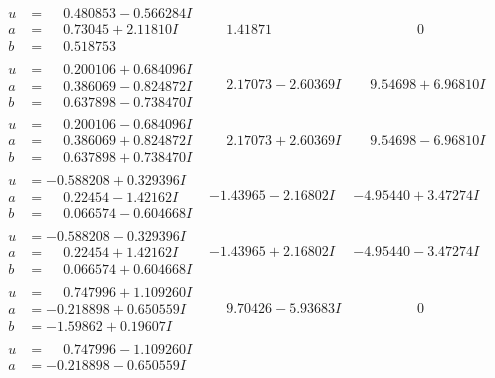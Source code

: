 \documentclass[1p]{elsarticle_modified}
\theoremstyle{definition}
\begin{document}
$$\begin{array}{c|c|c}
\begin{aligned}
u &= \phantom{-}0.480853 - 0.566284 I \\
a &= \phantom{-}0.73045 + 2.11810 I \\
b &= \phantom{-}0.518753\phantom{ +0.000000I}\end{aligned}
 & \phantom{-}1.41871\phantom{ +0.000000I} & \phantom{-0.000000 } 0 \\ \hline\begin{aligned}
u &= \phantom{-}0.200106 + 0.684096 I \\
a &= \phantom{-}0.386069 - 0.824872 I \\
b &= \phantom{-}0.637898 - 0.738470 I\end{aligned}
 & \phantom{-}2.17073 - 2.60369 I & \phantom{-}9.54698 + 6.96810 I \\ \hline\begin{aligned}
u &= \phantom{-}0.200106 - 0.684096 I \\
a &= \phantom{-}0.386069 + 0.824872 I \\
b &= \phantom{-}0.637898 + 0.738470 I\end{aligned}
 & \phantom{-}2.17073 + 2.60369 I & \phantom{-}9.54698 - 6.96810 I \\ \hline\begin{aligned}
u &= -0.588208 + 0.329396 I \\
a &= \phantom{-}0.22454 - 1.42162 I \\
b &= \phantom{-}0.066574 - 0.604668 I\end{aligned}
 & -1.43965 - 2.16802 I & -4.95440 + 3.47274 I \\ \hline\begin{aligned}
u &= -0.588208 - 0.329396 I \\
a &= \phantom{-}0.22454 + 1.42162 I \\
b &= \phantom{-}0.066574 + 0.604668 I\end{aligned}
 & -1.43965 + 2.16802 I & -4.95440 - 3.47274 I \\ \hline\begin{aligned}
u &= \phantom{-}0.747996 + 1.109260 I \\
a &= -0.218898 + 0.650559 I \\
b &= -1.59862 + 0.19607 I\end{aligned}
 & \phantom{-}9.70426 - 5.93683 I & \phantom{-0.000000 } 0 \\ \hline\begin{aligned}
u &= \phantom{-}0.747996 - 1.109260 I \\
a &= -0.218898 - 0.650559 I \\

\end{aligned}
\end{array}$$
\end{document}
